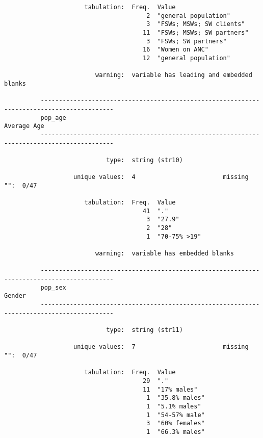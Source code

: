 \documentclass{article}
\begin{document}
\begin{verbatim}
                      tabulation:  Freq.  Value
                                       2  "general population"
                                       3  "FSWs; MSWs; SW clients"
                                      11  "FSWs; MSWs; SW partners"
                                       3  "FSWs; SW partners"
                                      16  "Women on ANC"
                                      12  "general population"
          
                         warning:  variable has leading and embedded blanks
          
          ------------------------------------------------------------------------------------------
          pop_age                                                                        Average Age
          ------------------------------------------------------------------------------------------
          
                            type:  string (str10)
          
                   unique values:  4                        missing "":  0/47
          
                      tabulation:  Freq.  Value
                                      41  "."
                                       3  "27.9"
                                       2  "28"
                                       1  "70-75% >19"
          
                         warning:  variable has embedded blanks
          
          ------------------------------------------------------------------------------------------
          pop_sex                                                                             Gender
          ------------------------------------------------------------------------------------------
          
                            type:  string (str11)
          
                   unique values:  7                        missing "":  0/47
          
                      tabulation:  Freq.  Value
                                      29  "."
                                      11  "17% males"
                                       1  "35.8% males"
                                       1  "5.1% males"
                                       1  "54-57% male"
                                       3  "60% females"
                                       1  "66.3% males"
          

\end{verbatim}
\end{document}
